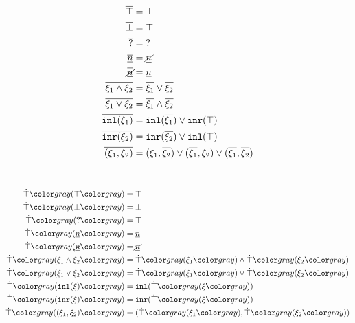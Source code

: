 ~~
\begin{subequations}\label{defn:dual}
\begin{align}
  \cdual{\ctruth} &= \cfalsity \\
  \cdual{\cfalsity} &= \ctruth \\
  \cdual{\cunknown} &= \cunknown \\
  \cdual{\cnum{n}} &= \cnotnum{n} \\
  \cdual{\cnotnum{n}} &= \cnum{n} \\
  \cdual{\cand{\xi_1}{\xi_2}} &= \cor{\cdual{\xi_1}}{\cdual{\xi_2}} \\
  \cdual{\cor{\xi_1}{\xi_2}} &= \cand{\cdual{\xi_1}}{\cdual{\xi_2}} \\
  \cdual{\cinl{\xi_1}} &= \cor{ \cinl{\cdual{\xi_1}} }{ \cinr{\ctruth} } \\
  \cdual{\cinr{\xi_2}} &= \cor{ \cinr{\cdual{\xi_2}} }{ \cinl{\ctruth} } \\
  \cdual{\cpair{\xi_1}{\xi_2}} &=
  \cor{ \cor{ 
    \cpair{\xi_1}{\cdual{\xi_2}}
  }{
    \cpair{\cdual{\xi_1}}{\xi_2}
  }}{
    \cpair{\cdual{\xi_1}}{\cdual{\xi_2}}
  }
\end{align}
\end{subequations}

\newpage

~~
\begin{subequations}\label{defn:truify}
\begin{align}
  \ctruify{\ctruth} &= \ctruth \\
  \ctruify{\cfalsity} &= \cfalsity \\
  \ctruify{\cunknown} &= \ctruth \\
  \ctruify{\cnum{n}} &= \cnum{n} \\
  \ctruify{\cnotnum{n}} &= \cnotnum{n} \\
  \ctruify{\cand{\xi_1}{\xi_2}} &= \cand{\ctruify{\xi_1}}{\ctruify{\xi_2}} \\
  \ctruify{\cor{\xi_1}{\xi_2}} &= \cor{\ctruify{\xi_1}}{\ctruify{\xi_2}} \\
  \ctruify{\cinl{\xi}} &= \cinl{\ctruify{\xi}} \\
  \ctruify{\cinr{\xi}} &= \cinr{\ctruify{\xi}} \\
  \ctruify{\cpair{\xi_1}{\xi_2}} &= \cpair{\ctruify{\xi_1}}{\ctruify{\xi_2}}
\end{align}
\end{subequations}

